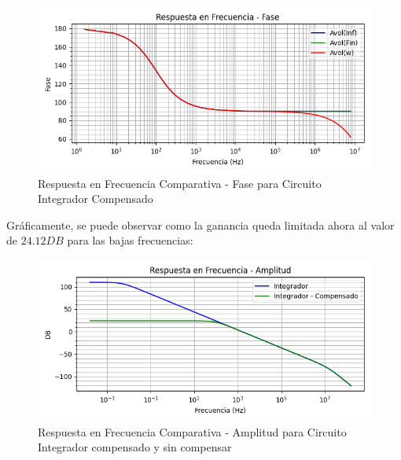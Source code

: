 \begin{figure}[H]
    \centering 
    \includegraphics [scale=0.6] {../Ejercicio3-CircuitoIntegradoresyDerivadores/Imagenes/diagrama-bode-integrador-compensado-fase.png} 
    \caption{Respuesta en Frecuencia Comparativa - Fase para Circuito Integrador Compensado }
    \label{fig:emptyPlotTool}
\end{figure}

Gráficamente, se puede observar como la ganancia queda limitada ahora al valor de $24.12DB$ para las bajas frecuencias:

\begin{figure}[H]
    \centering 
    \includegraphics [scale=0.6] {../Ejercicio3-CircuitoIntegradoresyDerivadores/Imagenes/diagrama-bode-integrador-compensado-comparativo-amplitud.png} 
    \caption{Respuesta en Frecuencia Comparativa - Amplitud para Circuito Integrador compensado y sin compensar}
    \label{fig:emptyPlotTool}
\end{figure}

